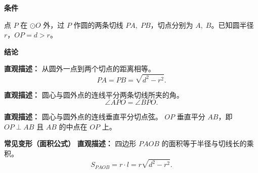\begin{statementbox}
	\textbf{\textcolor{CStatement}{条件}}
	\begin{description}[style=nextline, leftmargin=2.8em, labelsep=0.5em, itemsep=0.35em]
		\item[\textbf{\textcolor{CStatement}{条件 1（圆外一点切线）：}}] 点 $P$ 在 $\odot O$ 外，过 $P$ 作圆的两条切线 $PA,\;PB$，切点分别为 $A,\;B$。已知圆半径 $r$，$OP=d>r$。
	\end{description}

	\textbf{\textcolor{CStatement}{结论}}
	\begin{description}[style=nextline, leftmargin=2.8em, labelsep=0.5em, itemsep=0.45em]
		\item[\textbf{\textcolor{CStatement}{结论一（切线长相等）：}}]
			\textbf{\textcolor{CStatement}{直观描述：}}
			从圆外一点到两个切点的距离相等。
			\[
				PA = PB = \sqrt{d^{2} - r^{2}}.
			\]

		\item[\textbf{\textcolor{CStatement}{结论二（角平分性质）：}}]
			\textbf{\textcolor{CStatement}{直观描述：}}
			圆心与圆外点的连线平分两条切线所夹的角。
			\[
				\angle APO = \angle BPO.
			\]

		\item[\textbf{\textcolor{CStatement}{结论三（垂直平分性质）：}}]
			\textbf{\textcolor{CStatement}{直观描述：}}
			圆心与圆外点的连线垂直平分切点弦。
			$OP$ 垂直平分 $AB$，即 $OP\perp AB$ 且 $AB$ 的中点在 $OP$ 上。
	\end{description}

	\textbf{\textcolor{CStatement}{常见变形（面积公式）}}
	\textbf{\textcolor{CStatement}{直观描述：}}
	四边形 $PAOB$ 的面积等于半径与切线长的乘积。
	\[
		S_{PAOB} = r \cdot l = r\sqrt{d^{2} - r^{2}}.
	\]
\end{statementbox}
